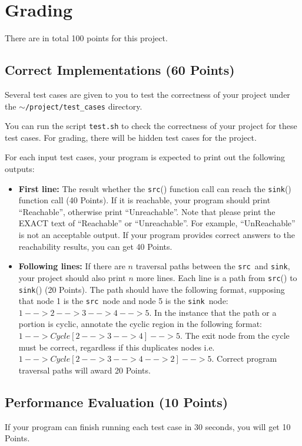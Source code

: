 \documentclass[12pt]{article}
\newcommand{\codeIn}[1]{{\small\tt{#1}}}
\newcommand{\src}{\codeIn{src}}
\newcommand{\sink}{\codeIn{sink}}
\begin{document}
\section{Grading}
There are in total 100 points for this project.

\subsection{Correct Implementations (60 Points)}

Several test cases are given to you to test the correctness of your project under the \codeIn{$\sim$/project/test\_cases} directory.

You can run the script \codeIn{test.sh} to check the correctness of your
project for these test cases. For grading, there will be hidden test
cases for the project.

For each input test cases, your program is expected to print out the following outputs:
\begin{itemize}
    \item \textbf{First line:} The result whether the \src () function call can reach the \sink () function call (40 Points). If it is reachable, your program should print ``Reachable'', otherwise print  ``Unreachable''. Note that please print the EXACT text of ``Reachable'' or ``Unreachable''. For example, ``UnReachable'' is not an acceptable  output.  If your program provides correct answers to the reachability results, you can get 40 Points.
    \item \textbf{Following lines:} If there are $n$ traversal paths between the \src\  and \sink, your project should also print $n$ more lines. Each line 
    is a path from \src () to \sink () (20 Points). The path should have
    the following format, supposing that node 1 is the \src\  node and node 5 is the \sink\  node: \codeIn{$1-->2-->3-->4-->5$}. In the instance that the path or a portion is cyclic, annotate the cyclic region in the following format: \codeIn{$1-->Cycle[2-->3-->4]-->5$}. The exit node from the cycle must be correct, regardless if this duplicates nodes i.e. \codeIn{$1-->Cycle[2-->3-->4-->2]-->5$}. Correct program traversal paths will award 20 Points.
\end{itemize}

\subsection{Performance Evaluation (10 Points)}\label{sec:eval}
If your program can finish running each test case in 30 seconds, you will get 10 Points.
\end{document}
